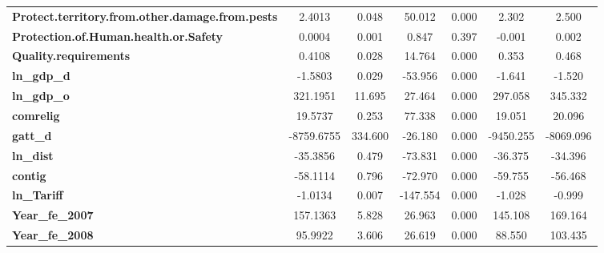 \begin{center}
\begin{tabular}{lcccccc}
\textbf{Protect.territory.from.other.damage.from.pests}            &       2.4013  &        0.048     &    50.012  &         0.000        &        2.302    &        2.500     \\
\textbf{Protection.of.Human.health.or.Safety}                      &       0.0004  &        0.001     &     0.847  &         0.397        &       -0.001    &        0.002     \\
\textbf{Quality.requirements}                                      &       0.4108  &        0.028     &    14.764  &         0.000        &        0.353    &        0.468     \\
\textbf{ln\_gdp\_d}                                                &      -1.5803  &        0.029     &   -53.956  &         0.000        &       -1.641    &       -1.520     \\
\textbf{ln\_gdp\_o}                                                &     321.1951  &       11.695     &    27.464  &         0.000        &      297.058    &      345.332     \\
\textbf{comrelig}                                                  &      19.5737  &        0.253     &    77.338  &         0.000        &       19.051    &       20.096     \\
\textbf{gatt\_d}                                                   &   -8759.6755  &      334.600     &   -26.180  &         0.000        &    -9450.255    &    -8069.096     \\
\textbf{ln\_dist}                                                  &     -35.3856  &        0.479     &   -73.831  &         0.000        &      -36.375    &      -34.396     \\
\textbf{contig}                                                    &     -58.1114  &        0.796     &   -72.970  &         0.000        &      -59.755    &      -56.468     \\
\textbf{ln\_Tariff}                                                &      -1.0134  &        0.007     &  -147.554  &         0.000        &       -1.028    &       -0.999     \\
\textbf{Year\_fe\_2007}                                            &     157.1363  &        5.828     &    26.963  &         0.000        &      145.108    &      169.164     \\
\textbf{Year\_fe\_2008}                                            &      95.9922  &        3.606     &    26.619  &         0.000        &       88.550    &      103.435     \\

\end{tabular}
\end{center}
